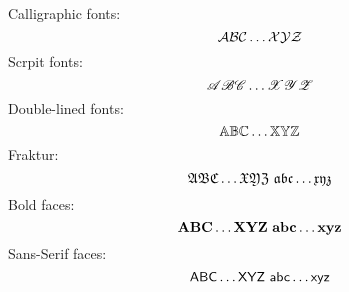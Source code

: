 \documentclass{article}
\begin{document}
    \noindent Calligraphic fonts:
    $$
        \calA\calB\calC\ldots\calX\calY\calZ
    $$
    Scrpit fonts:
    $$
        \scrA\scrB\scrC\ldots\scrX\scrY\scrZ
    $$
    Double-lined fonts:
    $$
        \AA\BB\CC\ldots\XX\YY\ZZ
    $$
    Fraktur:
    $$
        \frakA\frakB\frakC\ldots\frakX\frakY\frakZ~\fraka\frakb\frakc\ldots\frakx\fraky\frakz
    $$
    Bold faces:
    $$
        \bfA\bfB\bfC\ldots\bfX\bfY\bfZ~\bfa\bfb\bfc\ldots\bfx\bfy\bfz
    $$
    Sans-Serif faces:
    $$
        \sfA\sfB\sfC\ldots\sfX\sfY\sfZ~\sfa\sfb\sfc\ldots\sfx\sfy\sfz
    $$
\end{document}
